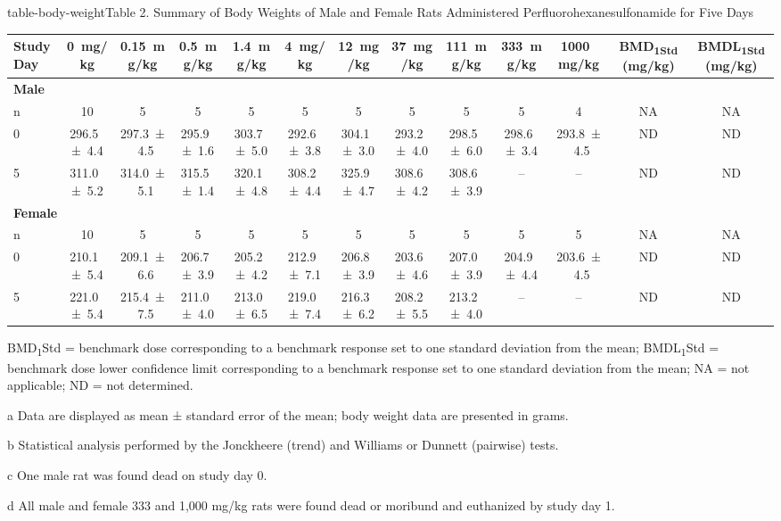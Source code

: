 \begin{landscape}
\begin{niehstable}{table-body-weight}{Table 2. Summary of Body Weights of Male and Female Rats Administered Perfluorohexanesulfonamide for Five Days}
\begin{tabular}{lcccccccccccc}
\toprule
Study Day & 0~mg/kg & 0.15~mg/kg & 0.5~mg/kg & 1.4~mg/kg & 4~mg/kg & 12~mg/kg & 37~mg/kg & 111~mg/kg & 333~mg/kg & 1000~mg/kg & BMD\textsubscript{1Std} (mg/kg) & BMDL\textsubscript{1Std} (mg/kg) \\
\midrule
\multicolumn{13}{l}{\textbf{Male}} \\
n & 10 & 5 & 5 & 5 & 5 & 5 & 5 & 5 & 5 & 4 & NA & NA \\
0 & 296.5 ± 4.4 & 297.3 ± 4.5 & 295.9 ± 1.6 & 303.7 ± 5.0 & 292.6 ± 3.8 & 304.1 ± 3.0 & 293.2 ± 4.0 & 298.5 ± 6.0 & 298.6 ± 3.4 & 293.8 ± 4.5 & ND & ND \\
5 & 311.0 ± 5.2 & 314.0 ± 5.1 & 315.5 ± 1.4 & 320.1 ± 4.8 & 308.2 ± 4.4 & 325.9 ± 4.7 & 308.6 ± 4.2 & 308.6 ± 3.9 & – & – & ND & ND \\
\multicolumn{13}{l}{\textbf{Female}} \\
n & 10 & 5 & 5 & 5 & 5 & 5 & 5 & 5 & 5 & 5 & NA & NA \\
0 & 210.1 ± 5.4 & 209.1 ± 6.6 & 206.7 ± 3.9 & 205.2 ± 4.2 & 212.9 ± 7.1 & 206.8 ± 3.9 & 203.6 ± 4.6 & 207.0 ± 3.9 & 204.9 ± 4.4 & 203.6 ± 4.5 & ND & ND \\
5 & 221.0 ± 5.4 & 215.4 ± 7.5 & 211.0 ± 4.0 & 213.0 ± 6.5 & 219.0 ± 7.4 & 216.3 ± 6.2 & 208.2 ± 5.5 & 213.2 ± 4.0 & – & – & ND & ND \\
\bottomrule
\end{tabular}
\begin{tablenotes}
\item BMD\textsubscript{1}Std = benchmark dose corresponding to a benchmark response set to one standard deviation from the mean; BMDL\textsubscript{1}Std = benchmark dose lower confidence limit corresponding to a benchmark response set to one standard deviation from the mean; NA = not applicable; ND = not determined.
\item[a] Data are displayed as mean ± standard error of the mean; body weight data are presented in grams.
\item[b] Statistical analysis performed by the Jonckheere (trend) and Williams or Dunnett (pairwise) tests.
\item[c] One male rat was found dead on study day 0.
\item[d] All male and female 333 and 1,000 mg/kg rats were found dead or moribund and euthanized by study day 1.
\end{tablenotes}
\end{niehstable}
\end{landscape}

